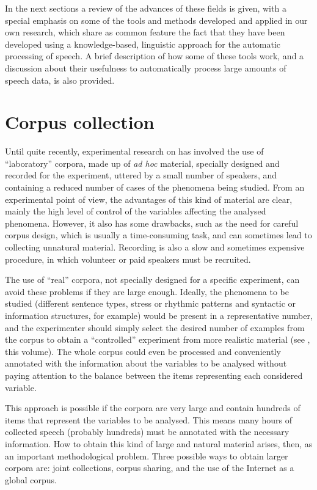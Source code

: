 \documentclass[output=paper]{langsci/langscibook}
\begin{document}
In the next sections a review of the advances of these fields is given, with a special emphasis on some of the tools and methods developed and applied in our own research, which share as common feature the fact that they have been developed using a knowledge-based, linguistic approach for the automatic processing of speech. A brief description of how some of these tools work, and a discussion about their usefulness to automatically process large amounts of speech data, is also provided.

\section{Corpus collection}

Until quite recently, experimental research on  has involved the use of ``laboratory'' corpora, made up of \textit{ad hoc} material, specially designed and recorded for the experiment, uttered by a small number of speakers, and containing a reduced number of cases of the phenomena being studied. From an experimental point of view, the advantages of this kind of material are clear, mainly the high level of control of the variables affecting the analysed phenomena. However, it also has some drawbacks, such as the need for careful corpus design, which is usually a time-consuming task, and can sometimes lead to collecting unnatural material. Recording is also a slow and sometimes expensive procedure, in which volunteer or paid speakers must be recruited.

The use of ``real'' corpora, not specially designed for a specific experiment, can avoid these problems if they are large enough. Ideally, the phenomena to be studied (different sentence types, stress or rhythmic patterns and syntactic or information structures, for example) would be present in a representative number, and the experimenter should simply select the desired number of examples from the corpus to obtain a ``controlled'' experiment from more realistic material (see \citeauthor{Peskova.2018}, this volume). The whole corpus could even be processed and conveniently annotated with the information about the variables to be analysed without paying attention to the balance between the items representing each considered variable.

This approach is possible if the corpora are very large and contain hundreds of items that represent the variables to be analysed. This means many hours of collected speech (probably hundreds) must be annotated with the necessary information. How to obtain this kind of large and natural material arises, then, as an important methodological problem. Three possible ways to obtain larger corpora are: joint collections, corpus sharing, and the use of the Internet as a global corpus.
\end{document}
